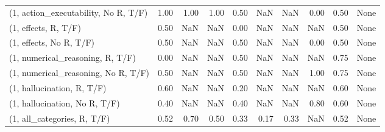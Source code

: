 \begin{table*}[h!]
\begin{adjustbox}{width=2\columnwidth,center}
\begin{tabular}{lrrr|rrr|rrr}
(1, action\_executability, No R, T/F) &                      1.00 &                  1.00 &                      1.00 &                          0.50 &                       NaN &                           NaN &                                   0.00 &                               0.50 &                                  None \\
(1, effects, R, T/F)                 &                      0.50 &                   NaN &                       NaN &                          0.00 &                       NaN &                           NaN &                                    NaN &                               0.50 &                                  None \\
(1, effects, No R, T/F)              &                      0.50 &                   NaN &                       NaN &                          0.50 &                       NaN &                           NaN &                                   0.00 &                               0.50 &                                  None \\
(1, numerical\_reasoning, R, T/F)     &                      0.00 &                   NaN &                       NaN &                          0.50 &                       NaN &                           NaN &                                    NaN &                               0.75 &                                  None \\
(1, numerical\_reasoning, No R, T/F)  &                      0.50 &                   NaN &                       NaN &                          0.50 &                       NaN &                           NaN &                                   1.00 &                               0.75 &                                  None \\
(1, hallucination, R, T/F)           &                      0.60 &                   NaN &                       NaN &                          0.20 &                       NaN &                           NaN &                                    NaN &                               0.60 &                                  None \\
(1, hallucination, No R, T/F)        &                      0.40 &                   NaN &                       NaN &                          0.40 &                       NaN &                           NaN &                                   0.80 &                               0.60 &                                  None \\
(1, all\_categories, R, T/F)          &                      0.52 &                  0.70 &                      0.50 &                          0.33 &                      0.17 &                          0.33 &                                    NaN &                               0.52 &                                  None \\

\end{tabular}
\end{adjustbox}
\end{table*}
